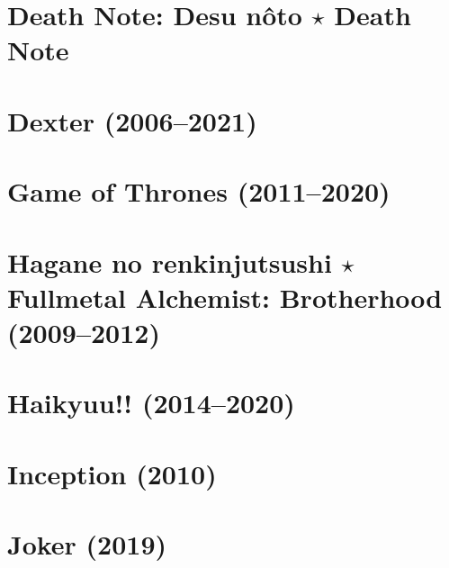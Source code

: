 \documentclass{book}
\numberwithin{equation}{section}
\begin{document}

\chapter{Death Note: Desu nôto $\star$ Death Note}


\chapter{Dexter (2006--2021)}


\chapter{Game of Thrones (2011--2020)}


\chapter{Hagane no renkinjutsushi $\star$ Fullmetal Alchemist: Brotherhood (2009--2012)}


\chapter{Haikyuu!! (2014--2020)}


\chapter{Inception (2010)}


\chapter{Joker (2019)}

\end{document}
